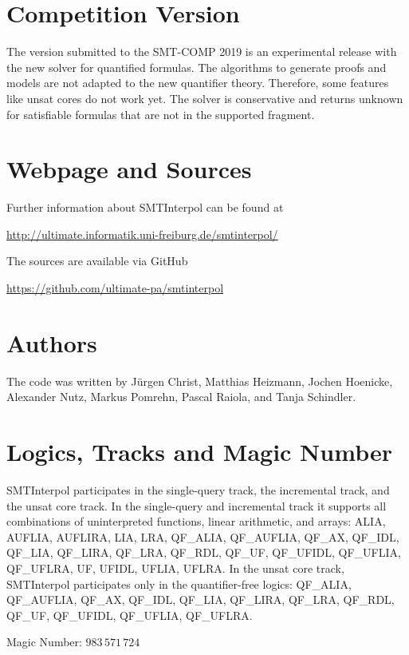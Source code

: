 \documentclass[a4paper]{easychair}
\newcommand\SI{SMTInterpol\xspace}
\begin{document}
\section*{Competition Version}
The version submitted to the SMT-COMP 2019 is an experimental release with the new solver for quantified formulas.
The algorithms to generate proofs and models are not adapted to the new quantifier theory.
Therefore, some features like unsat cores do not work yet.
The solver is conservative and returns unknown for satisfiable formulas that are not in the supported fragment.

\section*{Webpage and Sources}
Further information about \SI can be found at
\begin{center}
  \url{http://ultimate.informatik.uni-freiburg.de/smtinterpol/}
\end{center}
The sources are available via GitHub
\begin{center}
  \url{https://github.com/ultimate-pa/smtinterpol}
\end{center}

\section*{Authors}
The code was written by J{\"u}rgen Christ, Matthias Heizmann, Jochen Hoenicke, Alexander Nutz, 
Markus Pomrehn, Pascal Raiola, and Tanja Schindler.

\section*{Logics, Tracks and Magic Number}

\SI participates in the single-query track, the incremental track, and the
unsat core track.  In the single-query and incremental track it supports all
combinations of uninterpreted functions, linear arithmetic, and
arrays: ALIA, AUFLIA, AUFLIRA, LIA, LRA, QF\_ALIA, QF\_AUFLIA, QF\_AX,
QF\_IDL, QF\_LIA, QF\_LIRA, QF\_LRA, QF\_RDL, QF\_UF, QF\_UFIDL,
QF\_UFLIA, QF\_UFLRA, UF, UFIDL, UFLIA, UFLRA.
In the unsat core track, \SI participates only in the quantifier-free logics:
QF\_ALIA, QF\_AUFLIA, QF\_AX,
QF\_IDL, QF\_LIA, QF\_LIRA, QF\_LRA, QF\_RDL, QF\_UF, QF\_UFIDL,
QF\_UFLIA, QF\_UFLRA.

Magic Number: $983\,571\,724$



\end{document}
